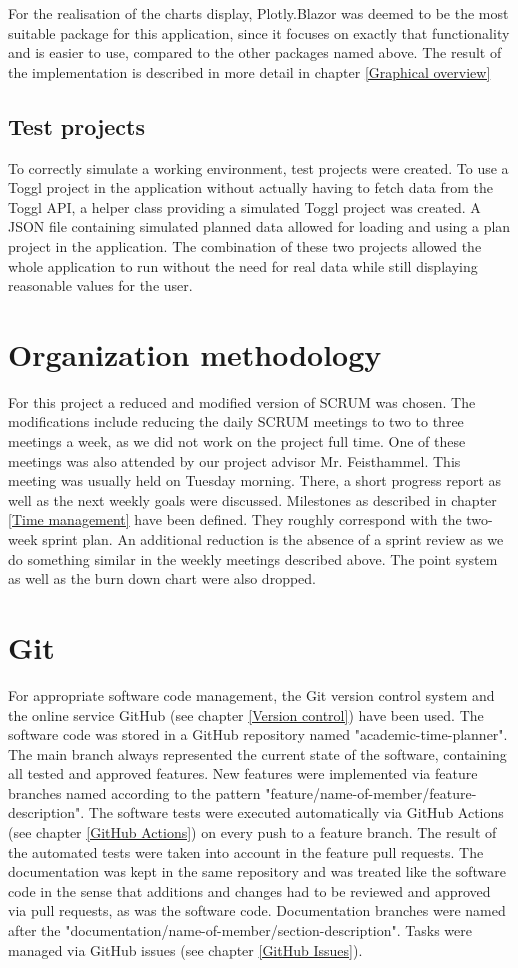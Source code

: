 For the realisation of the charts display, Plotly.Blazor was deemed to be the most suitable package for this application, since it focuses on exactly that functionality and is easier to use, compared to the other packages named above. The result of the implementation is described in more detail in chapter \ref{Graphical overview}

\subsection{Test projects}
To correctly simulate a working environment, test projects were created. To use a Toggl project in the application without actually having to fetch data from the Toggl API, a helper class providing a simulated Toggl project was created. A JSON file containing simulated planned data allowed for loading and using a plan project in the application. The combination of these two projects allowed the whole application to run without the need for real data while still displaying reasonable values for the user.

\section{Organization methodology}
For this project a reduced and modified version of SCRUM \cite{scrum_url} was chosen. The modifications include reducing the daily SCRUM meetings to two to three meetings a week, as we did not work on the project full time. One of these meetings was also attended by our project advisor Mr. Feisthammel. This meeting was usually held on Tuesday morning. There, a short progress report as well as the next weekly goals were discussed. Milestones as described in chapter \ref{Time management} have been defined. They roughly correspond with the two-week sprint plan. An additional reduction is the absence of a sprint review as we do something similar in the weekly meetings described above. The point system as well as the burn down chart were also dropped.

\section{Git}
For appropriate software code management, the Git version control system and the online service GitHub (see chapter \ref{Version control}) have been used. The software code was stored in a GitHub repository named "academic-time-planner". The main branch always represented the current state of the software, containing all tested and approved features. New features were implemented via feature branches named according to the pattern "feature/name-of-member/feature-description". The software tests were executed automatically via GitHub Actions (see chapter \ref{GitHub Actions}) on every push to a feature branch. The result of the automated tests were taken into account in the feature pull requests. The documentation was kept in the same repository and was treated like the software code in the sense that additions and changes had to be reviewed and approved via pull requests, as was the software code. Documentation branches were named after the "documentation/name-of-member/section-description". Tasks were managed via GitHub issues (see chapter \ref{GitHub Issues}).

